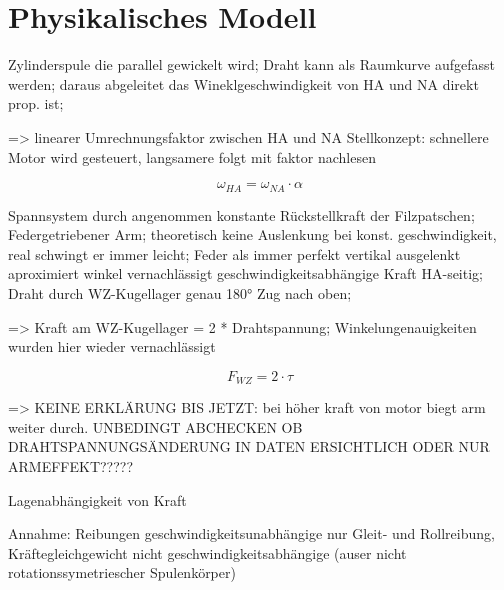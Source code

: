 \section{Physikalisches Modell}
\label{sec:Physikalisches Modell}


Zylinderspule die parallel gewickelt wird; Draht kann als Raumkurve aufgefasst werden; daraus abgeleitet das Wineklgeschwindigkeit von HA und NA direkt prop. ist;

=> linearer Umrechnungsfaktor zwischen HA und NA
    Stellkonzept: schnellere Motor wird gesteuert, langsamere folgt mit faktor nachlesen

\begin{equation}
    \omega_{HA} = \omega_{NA} \cdot \alpha
\end{equation}

Spannsystem durch angenommen konstante Rückstellkraft der Filzpatschen; Federgetriebener Arm; theoretisch keine Auslenkung bei konst. geschwindigkeit, real schwingt er immer leicht; Feder als immer perfekt vertikal ausgelenkt aproximiert winkel vernachlässigt geschwindigkeitsabhängige Kraft HA-seitig; Draht durch WZ-Kugellager genau 180° Zug nach oben;

=> Kraft am WZ-Kugellager = 2 * Drahtspannung; Winkelungenauigkeiten wurden hier wieder vernachlässigt

\begin{equation}
    \label{eq:wz_kraft}
    F_{WZ} = 2 \cdot \tau
\end{equation}

=> KEINE ERKLÄRUNG BIS JETZT: bei höher kraft von motor biegt arm weiter durch.
UNBEDINGT ABCHECKEN OB DRAHTSPANNUNGSÄNDERUNG IN DATEN ERSICHTLICH ODER NUR ARMEFFEKT?????


Lagenabhängigkeit von Kraft


Annahme: Reibungen geschwindigkeitsunabhängige nur Gleit- und Rollreibung, Kräftegleichgewicht nicht geschwindigkeitsabhängige (auser nicht rotationssymetriescher Spulenkörper)

